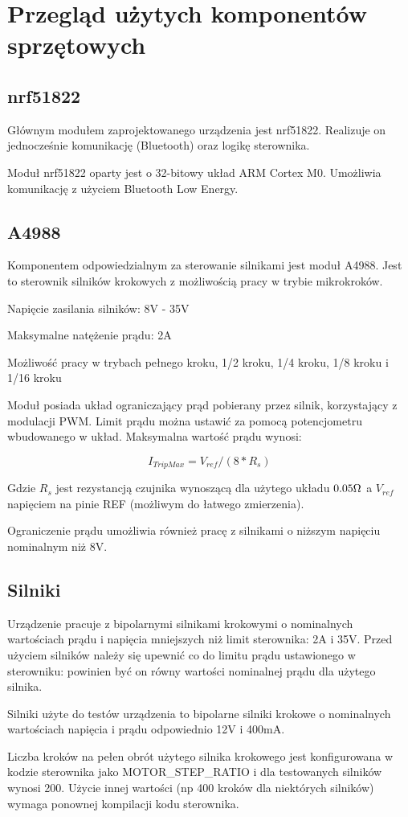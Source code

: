 \section{Przegląd użytych komponentów sprzętowych}

\subsection{nrf51822}

Głównym modułem zaprojektowanego urządzenia jest nrf51822. Realizuje on
jednocześnie komunikację (Bluetooth) oraz logikę sterownika.

Moduł nrf51822 oparty jest o 32-bitowy układ ARM Cortex M0. Umożliwia
komunikację z użyciem Bluetooth Low Energy.

\subsection{A4988}

Komponentem odpowiedzialnym za sterowanie silnikami jest moduł A4988. Jest to
sterownik silników krokowych z możliwością pracy w trybie mikrokroków.

Napięcie zasilania silników: 8V - 35V

Maksymalne natężenie prądu: 2A

Możliwość pracy w trybach pełnego kroku, 1/2 kroku, 1/4 kroku, 1/8 kroku
i 1/16 kroku

Moduł posiada układ ograniczający prąd pobierany przez silnik, korzystający
z modulacji PWM. Limit prądu można ustawić za pomocą potencjometru wbudowanego
w układ.  Maksymalna wartość prądu wynosi:

$$I_{TripMax} = V_{ref}/(8*R_s)$$

Gdzie $R_s$ jest rezystancją czujnika wynoszącą dla użytego układu $0.05\ohm$
a $V_{ref}$ napięciem na pinie REF (możliwym do łatwego zmierzenia).

Ograniczenie prądu umożliwia również pracę z silnikami o niższym napięciu
nominalnym niż 8V.

\subsection{Silniki}

Urządzenie pracuje z bipolarnymi silnikami krokowymi o nominalnych wartościach
prądu i napięcia mniejszych niż limit sterownika: 2A i 35V. Przed użyciem
silników należy się upewnić co do limitu prądu ustawionego w sterowniku:
powinien być on równy wartości nominalnej prądu dla użytego silnika.

Silniki użyte do testów urządzenia to bipolarne silniki krokowe o nominalnych
wartościach napięcia i prądu odpowiednio 12V i 400mA.

Liczba kroków na pełen obrót użytego silnika krokowego jest konfigurowana w kodzie sterownika
jako MOTOR\_STEP\_RATIO i dla testowanych silników wynosi 200. Użycie innej
wartości (np 400 kroków dla niektórych silników) wymaga ponownej kompilacji
kodu sterownika.
